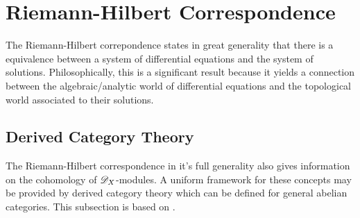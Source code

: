 \section{Riemann-Hilbert Correspondence}
The Riemann-Hilbert correpondence states in great generality that there is a equivalence between a system of differential equations and the system of solutions.
Philosophically, this is a significant result because it yields a connection between the algebraic/analytic world of differential equations and the topological world associated to their solutions.
\subsection{Derived Category Theory}
The Riemann-Hilbert correspondence in it's full generality also gives information on the cohomology of $\mathscr{D}_X$-modules.
A uniform framework for these concepts may be provided by derived category theory which can be defined for general abelian categories.
This subsection is based on \cite[Chapter 1]{dimca2004sheaves}.

